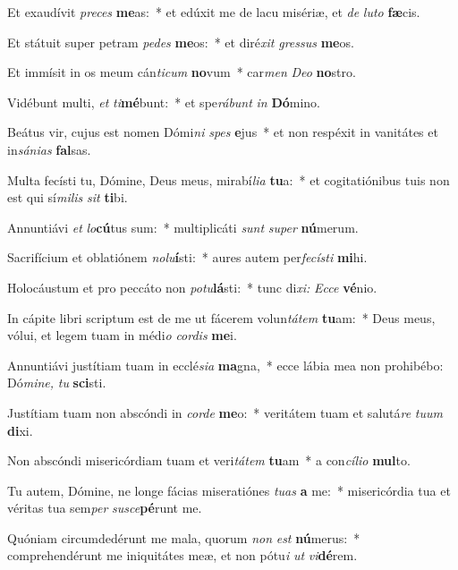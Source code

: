 \item Et exaudívit \textit{preces} \textbf{me}as:~* et edúxit me de lacu misériæ, et \textit{de} \textit{luto} \textbf{fæ}cis.
\item Et státuit super petram \textit{pedes} \textbf{me}os:~* et diré\tinyhspace\textit{xit} \textit{gressus} \textbf{me}os.
\item Et immísit in os meum cán\tinyhspace\textit{ticum} \textbf{no}vum~* car\textit{men} \textit{Deo} \textbf{no}stro.
\item Vidébunt multi, \textit{et} \textit{ti}\textbf{mé}bunt:~* et spe\textit{rábunt} \textit{in} \textbf{Dó}mino.
\item Beátus vir, cujus est nomen Dómi\tinyhspace\textit{ni} \textit{spes} \textbf{e}jus~* et non respéxit in vanitátes et in\spurhspace\textit{sánias} \textbf{fal}sas.
\item Multa fecísti tu, Dómine, Deus meus, mirabí\tinyhspace\textit{lia} \textbf{tu}a:~* et cogitatiónibus tuis non est qui sí\tinyhspace\textit{milis} \textit{sit} \textbf{ti}bi.
\item Annuntiávi \textit{et} \textit{lo}\textbf{cú}tus sum:~* multiplicáti \textit{sunt} \textit{super} \textbf{nú}merum.
\item Sacrifícium et oblatiónem \textit{nolu}\textbf{í}sti:~* aures autem per\textit{fecísti} \textbf{mi}hi.
\item Holocáustum et pro peccáto non \textit{potu}\textbf{lá}sti:~* tunc di\spurhspace\textit{xi:} \textit{Ecce} \textbf{vé}nio.
\item In cápite libri scriptum est de me ut fácerem volun\hspace*{0.01em}\textit{tátem} \textbf{tu}am:~* Deus meus, vólui, et legem tuam in médi\tinyhspace\textit{o} \textit{cordis} \textbf{me}i.
\item Annuntiávi justítiam tuam in ecclé\tinyhspace\textit{sia} \textbf{ma}gna,~* ecce lábia mea non prohibébo: Dó\textit{mine,} \textit{tu} \textbf{sci}sti.
\item Justítiam tuam non abscóndi in \textit{corde} \textbf{me}o:~* veritátem tuam et salutá\tinyhspace\textit{re} \textit{tuum} \textbf{di}xi.
\item Non abscóndi misericórdiam tuam et veri\tinyhspace\textit{tátem} \textbf{tu}am~* a con\textit{cílio} \textbf{mul}to.
\item Tu autem, Dómine, ne longe fácias miseratiónes \textit{tuas} \textbf{a} me:~* misericórdia tua et véritas tua sem\textit{per} \textit{susce}\textbf{pé}runt me.
\item Quóniam circumdedérunt me mala, quorum \textit{non} \textit{est} \textbf{nú}merus:~* comprehendérunt me iniquitátes meæ, et non pótu\textit{i} \textit{ut} \textit{vi}\textbf{dé}rem.

